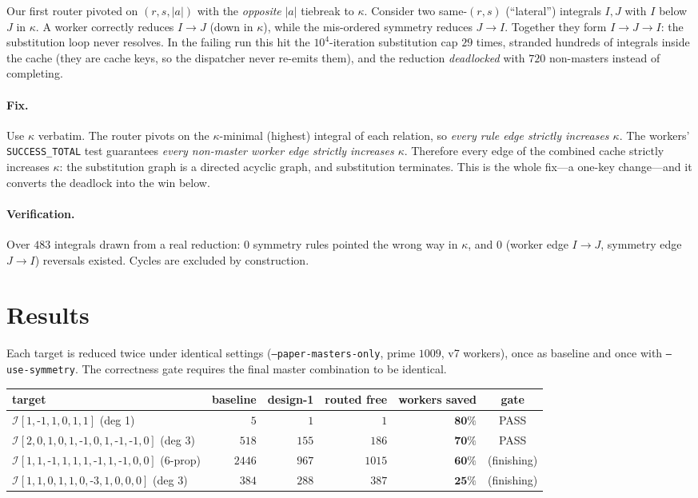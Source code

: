 \documentclass[11pt]{article}
\newcommand{\I}[1]{\mathcal{I}[#1]}
\newcommand{\kk}{\kappa}
\newcommand{\code}[1]{\texttt{#1}}
\begin{document}
Our first router pivoted on $(r,s,|a|)$ with the \emph{opposite} $|a|$ tiebreak to
$\kk$. Consider two same-$(r,s)$ (``lateral'') integrals $I,J$ with $I$ below $J$ in
$\kk$. A worker correctly reduces $I\to J$ (down in $\kk$), while the mis-ordered
symmetry reduces $J\to I$. Together they form $I\to J\to I$: the substitution loop
never resolves. In the failing run this hit the $10^4$-iteration substitution cap $29$
times, stranded hundreds of integrals inside the cache (they are cache keys, so the
dispatcher never re-emits them), and the reduction \emph{deadlocked} with $720$
non-masters instead of completing.

\paragraph{Fix.} Use $\kk$ verbatim. The router pivots on the $\kk$-minimal (highest)
integral of each relation, so \emph{every rule edge strictly increases $\kk$}. The
workers' \code{SUCCESS\_TOTAL} test guarantees \emph{every non-master worker edge
strictly increases $\kk$}. Therefore every edge of the combined cache strictly
increases $\kk$: the substitution graph is a directed acyclic graph, and substitution
terminates. This is the whole fix---a one-key change---and it converts the deadlock
into the win below.

\paragraph{Verification.} Over $483$ integrals drawn from a real reduction: $0$ symmetry
rules pointed the wrong way in $\kk$, and $0$ (worker edge $I\to J$, symmetry edge
$J\to I$) reversals existed. Cycles are excluded by construction.

\section{Results}
\label{sec:results}
Each target is reduced twice under identical settings (\code{--paper-masters-only},
prime $1009$, v7 workers), once as baseline and once with \code{--use-symmetry}. The
correctness gate requires the final master combination to be identical.

\begin{center}
\footnotesize
\begin{tabular}{lrrrrc}
\toprule
target & baseline & design-1 & routed free & workers saved & gate \\
\midrule
$\I{1,\text{-}1,1,0,1,1}$ (deg 1)                 & $5$    & $1$   & $1$    & $\mathbf{80\%}$ & PASS \\
$\I{2,0,1,0,1,\text{-}1,0,1,\text{-}1,\text{-}1,0}$ (deg 3) & $518$  & $155$ & $186$  & $\mathbf{70\%}$ & PASS \\
$\I{1,1,\text{-}1,1,1,1,\text{-}1,1,\text{-}1,0,0}$ (6-prop) & $2446$ & $967$ & $1015$ & $\mathbf{60\%}$ & (finishing)\\
$\I{1,1,0,1,1,0,\text{-}3,1,0,0,0}$ (deg 3)       & $384$  & $288$ & $387$  & $\mathbf{25\%}$ & (finishing)\\
\bottomrule
\end{tabular}
\end{center}
\end{document}
